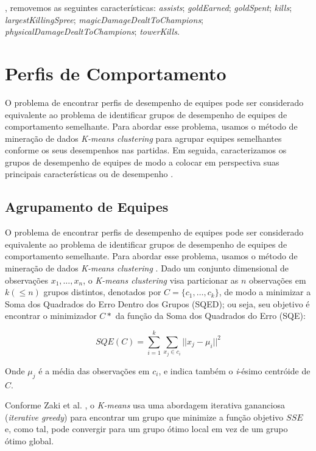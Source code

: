 , removemos as seguintes características: \textit{assists}; \textit{goldEarned}; \textit{goldSpent}; \textit{kills}; \textit{largestKillingSpree}; \textit{magicDamageDealtToChampions}; \textit{physicalDamageDealtToChampions}; \textit{towerKills}.

\chapter{Perfis de Comportamento} \label{cap:perfiscomportamento}

O problema de encontrar perfis de desempenho de equipes pode ser considerado equivalente ao problema de identificar grupos de desempenho de equipes de comportamento semelhante. Para abordar esse problema, usamos o método de mineração de dados \textit{K-means clustering} \cite{zaki2014data} para agrupar equipes semelhantes conforme os seus desempenhos nas partidas. Em seguida, caracterizamos  os grupos de desempenho de equipes de modo a colocar em perspectiva suas principais características ou  de desempenho .

\section{Agrupamento de Equipes} \label{agrupamentoequipes}
O problema de encontrar perfis de desempenho de equipes pode ser considerado equivalente ao problema de identificar grupos de desempenho de equipes de comportamento semelhante. Para abordar esse problema, usamos o método de mineração de dados \textit{K-means clustering} \cite{zaki2014data}. Dado um conjunto dimensional de observações \(x_1, \ldots, x_n \), o \textit{K-means clustering} visa particionar as $n$ observações em $k (\leq n)$ grupos distintos, denotados por $ C = \{c_1, \ldots , c_k \} $, de modo a minimizar a Soma dos Quadrados do Erro Dentro dos Grupos (SQED); ou seja, seu objetivo é encontrar o minimizador $C*$ da função da Soma dos Quadrados do Erro (SQE):

\begin{displaymath}
  SQE(C) = \sum_{i=1}^{k} \sum_{x_j \in c_i}{} || x_j - \mu _i ||^2
\end{displaymath}

Onde $\mu_j$ é a média das observações em $c_i$, e indica também o \textit{i}-ésimo centróide de $C$.

Conforme Zaki et al. \cite{zaki2014data}, o \textit{K-means} usa uma abordagem iterativa gananciosa (\textit{iterative greedy}) para encontrar um grupo que minimize a função objetivo $SSE$ e, como tal, pode convergir para um grupo ótimo local em vez de um grupo ótimo global.

